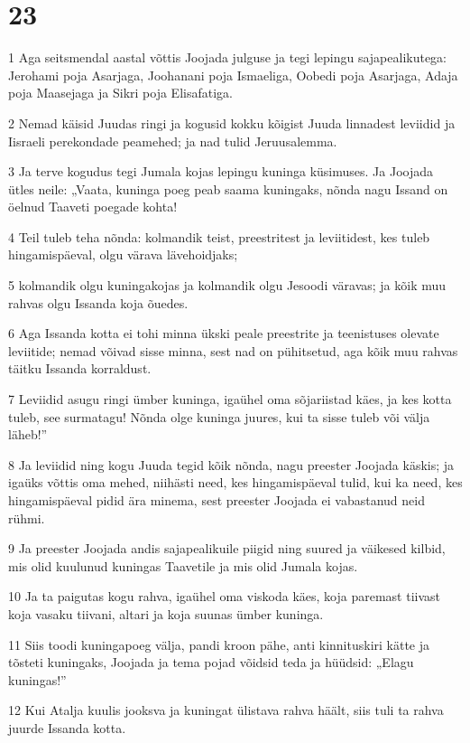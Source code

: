 \chapter{23}

\par 1 Aga seitsmendal aastal võttis Joojada julguse ja tegi lepingu sajapealikutega: Jerohami poja Asarjaga, Joohanani poja Ismaeliga, Oobedi poja Asarjaga, Adaja poja Maasejaga ja Sikri poja Elisafatiga.
\par 2 Nemad käisid Juudas ringi ja kogusid kokku kõigist Juuda linnadest leviidid ja Iisraeli perekondade peamehed; ja nad tulid Jeruusalemma.
\par 3 Ja terve kogudus tegi Jumala kojas lepingu kuninga küsimuses. Ja Joojada ütles neile: „Vaata, kuninga poeg peab saama kuningaks, nõnda nagu Issand on öelnud Taaveti poegade kohta!
\par 4 Teil tuleb teha nõnda: kolmandik teist, preestritest ja leviitidest, kes tuleb hingamispäeval, olgu värava lävehoidjaks;
\par 5 kolmandik olgu kuningakojas ja kolmandik olgu Jesoodi väravas; ja kõik muu rahvas olgu Issanda koja õuedes.
\par 6 Aga Issanda kotta ei tohi minna ükski peale preestrite ja teenistuses olevate leviitide; nemad võivad sisse minna, sest nad on pühitsetud, aga kõik muu rahvas täitku Issanda korraldust.
\par 7 Leviidid asugu ringi ümber kuninga, igaühel oma sõjariistad käes, ja kes kotta tuleb, see surmatagu! Nõnda olge kuninga juures, kui ta sisse tuleb või välja läheb!”
\par 8 Ja leviidid ning kogu Juuda tegid kõik nõnda, nagu preester Joojada käskis; ja igaüks võttis oma mehed, niihästi need, kes hingamispäeval tulid, kui ka need, kes hingamispäeval pidid ära minema, sest preester Joojada ei vabastanud neid rühmi.
\par 9 Ja preester Joojada andis sajapealikuile piigid ning suured ja väikesed kilbid, mis olid kuulunud kuningas Taavetile ja mis olid Jumala kojas.
\par 10 Ja ta paigutas kogu rahva, igaühel oma viskoda käes, koja paremast tiivast koja vasaku tiivani, altari ja koja suunas ümber kuninga.
\par 11 Siis toodi kuningapoeg välja, pandi kroon pähe, anti kinnituskiri kätte ja tõsteti kuningaks, Joojada ja tema pojad võidsid teda ja hüüdsid: „Elagu kuningas!”
\par 12 Kui Atalja kuulis jooksva ja kuningat ülistava rahva häält, siis tuli ta rahva juurde Issanda kotta.
